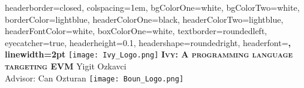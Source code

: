 \documentclass[landscape,a1paper,fontscale=0.485]{baposter} %
\begin{document}
\begin{poster}
{
headerborder=closed, %
colspacing=1em, %
bgColorOne=white, %
bgColorTwo=white, %
borderColor=lightblue, %
headerColorOne=black, %
headerColorTwo=lightblue, %
headerFontColor=white, %
boxColorOne=white, %
textborder=roundedleft, %
eyecatcher=true, %
headerheight=0.1\textheight, %
headershape=roundedright, %
headerfont=\Large\bf\textsc, %
linewidth=2pt %
}
%
{\texttt{[image: Ivy\_Logo.png]}} %
{\bf\textsc{Ivy: A programming language targeting EVM}\vspace{0.5em}} %
{ Yigit Ozkavci \\\hspace{12pt} Advisor: Can Ozturan } %
{\texttt{[image: Boun\_Logo.png]}} %


\end{poster}
\end{document}
